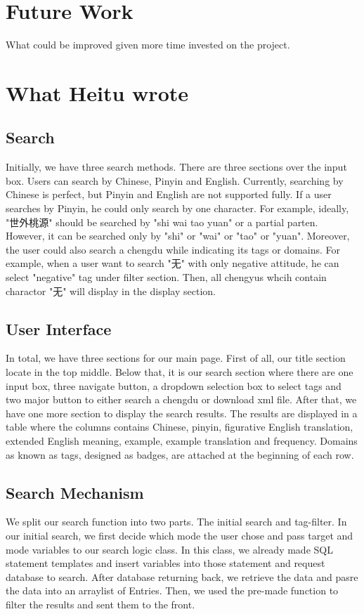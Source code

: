 \documentclass[11pt]{article} %
\begin{document}
\section{Future Work}

\indent What could be improved given more time invested on the project. 

\section{What Heitu wrote}
\subsection{Search}
\indent Initially, we have three search methods. There are three sections over the input box. Users can search by Chinese, Pinyin and English. Currently, searching by Chinese is perfect, but Pinyin and English are not supported fully. If a user searches by Pinyin, he could only search by one character. For example, ideally, "世外桃源" should be searched by "shi wai tao yuan" or a partial parten. However, it can be searched only by "shi" or "wai" or "tao" or "yuan". Moreover, the user could also search a chengdu while indicating its tags or domains. For example, when a user want to search "无" with only negative attitude, he can select "negative" tag under filter section. Then, all chengyus whcih contain charactor "无" will display in the display section. 

\subsection{User Interface}
\indent In total, we have three sections for our main page. First of all, our title section locate in the top middle. Below that, it is our search section where there are one input box, three navigate button, a dropdown selection box to select tags and two major button to either search a chengdu or download xml file. After that, we have one more section to display the search results. The results are displayed in a table where the columns contains Chinese, pinyin, figurative English translation, extended English meaning, example, example translation and frequency. Domains as known as tags, designed as badges, are attached at the beginning of each row.

\subsection{Search Mechanism}
\indent We split our search function into two parts. The initial search and tag-filter. In our initial search, we first decide which mode the user chose and pass target and mode variables to our search logic class. In this class, we already made SQL statement templates and insert variables into those statement and request database to search. After database returning back, we retrieve the data and pasre the data into an arraylist of Entries. Then, we used the pre-made function to filter the results and sent them to the front.



\end{document}
